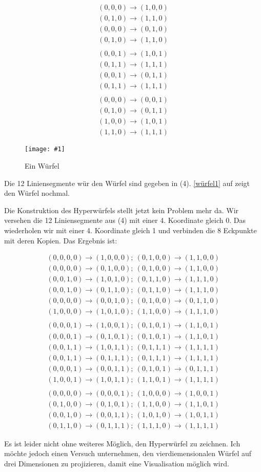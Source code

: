 \documentclass[10pt,a4paper,twoside,titlepage]{article}
\newcommand{\myeq}[2]{
	\begin{equation}
		\begin{split}
			#1
		\end{split}
		\label{#2}
	\end{equation}
}
\newcommand{\image}[4]{
	\begin{figure}[!ht]
		\centering
		\texttt{[image: \#1]}
		\caption{#2}
		\label{#3}
	\end{figure}
}
\begin{document}
\myeq{(0,0,0)\rightarrow(1,0,0)\\
	(0,1,0)\rightarrow(1,1,0)\\
	(0,0,0)\rightarrow(0,1,0)\\
	(0,1,0)\rightarrow(1,1,0)\\
	\\
	(0,0,1)\rightarrow(1,0,1)\\
	(0,1,1)\rightarrow(1,1,1)\\
	(0,0,1)\rightarrow(0,1,1)\\
	(0,1,1)\rightarrow(1,1,1)\\
	\\
	(0,0,0)\rightarrow(0,0,1)\\
	(0,1,0)\rightarrow(0,1,1)\\
	(1,0,0)\rightarrow(1,0,1)\\
	(1,1,0)\rightarrow(1,1,1)
}{würfel}

\image{img/wuerfel.eps}{Ein Würfel}{würfel1}{6}

Die 12 Liniensegmente wür den Würfel sind gegeben in (4). \autoref{würfel1} auf
 zeigt den Würfel nochmal.

Die Konstruktion des Hyperwürfels stellt jetzt kein Problem mehr da. Wir
versehen die 12 Liniensegmente aus (4) mit einer 4. Koordinate gleich 0.
Das wiederholen wir mit einer 4. Koordinate gleich 1 und verbinden die 8
Eckpunkte mit deren Kopien. Das Ergebnis ist:

\myeq{(0,0,0,0)\rightarrow(1,0,0,0);\
	(0,1,0,0)\rightarrow(1,1,0,0)\\
	(0,0,0,0)\rightarrow(0,1,0,0);\
	(0,1,0,0)\rightarrow(1,1,0,0)\\
	(0,0,1,0)\rightarrow(1,0,1,0);\
	(0,1,1,0)\rightarrow(1,1,1,0)\\
	(0,0,1,0)\rightarrow(0,1,1,0);\
	(0,1,1,0)\rightarrow(1,1,1,0)\\
	(0,0,0,0)\rightarrow(0,0,1,0);\
	(0,1,0,0)\rightarrow(0,1,1,0)\\
	(1,0,0,0)\rightarrow(1,0,1,0);\
	(1,1,0,0)\rightarrow(1,1,1,0)\\
	\\
	(0,0,0,1)\rightarrow(1,0,0,1);\
	(0,1,0,1)\rightarrow(1,1,0,1)\\
	(0,0,0,1)\rightarrow(0,1,0,1);\
	(0,1,0,1)\rightarrow(1,1,0,1)\\
	(0,0,1,1)\rightarrow(1,0,1,1);\
	(0,1,1,1)\rightarrow(1,1,1,1)\\
	(0,0,1,1)\rightarrow(0,1,1,1);\
	(0,1,1,1)\rightarrow(1,1,1,1)\\
	(0,0,0,1)\rightarrow(0,0,1,1);\
	(0,1,0,1)\rightarrow(0,1,1,1)\\
	(1,0,0,1)\rightarrow(1,0,1,1);\
	(1,1,0,1)\rightarrow(1,1,1,1)\\
	\\
	(0,0,0,0)\rightarrow(0,0,0,1);\
	(1,0,0,0)\rightarrow(1,0,0,1)\\
	(0,1,0,0)\rightarrow(0,1,0,1);\
	(1,1,0,0)\rightarrow(1,1,0,1)\\
	(0,0,1,0)\rightarrow(0,0,1,1);\
	(1,0,1,0)\rightarrow(1,0,1,1)\\
	(0,1,1,0)\rightarrow(0,1,1,1);\
	(1,1,1,0)\rightarrow(1,1,1,1)
}{hyperw}

Es ist leider nicht ohne weiteres Möglich, den Hyperwürfel zu zeichnen.
Ich möchte jedoch einen Versuch unternehmen, den vierdiemensionalen Würfel
auf drei Dimensionen zu projizieren, damit eine Visualisation möglich wird.
\end{document}
